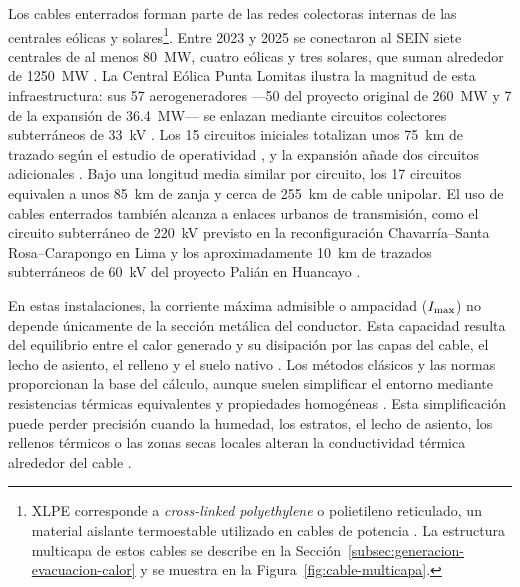 Los cables enterrados forman parte de las redes colectoras internas de las centrales eólicas y solares\footnote{XLPE corresponde a \textit{cross-linked polyethylene} o polietileno reticulado, un material aislante termoestable utilizado en cables de potencia \parencites[9--10]{thue1999electrical}{iec60502_2_2014}. La estructura multicapa de estos cables se describe en la Sección~\ref{subsec:generacion-evacuacion-calor} y se muestra en la Figura~\ref{fig:cable-multicapa}.}. Entre 2023 y 2025 se conectaron al SEIN siete centrales de al menos \SI{80}{\mega\watt}, cuatro eólicas y tres solares, que suman alrededor de \SI{1250}{\mega\watt} \parencites{osinergmin2024puntaLomitas}{minem2024nuevasRER}{minem2025nuevasCentrales}. La Central Eólica Punta Lomitas ilustra la magnitud de esta infraestructura: sus 57 aerogeneradores ---50 del proyecto original de \SI{260}{\mega\watt} y 7 de la expansión de \SI{36,4}{\mega\watt}--- se enlazan mediante circuitos colectores subterráneos de \SI{33}{\kilo\volt} \parencites{coes2021puntaLomitasEO}{engie2023puntaLomitas}. Los 15 circuitos iniciales totalizan unos \SI{75}{\kilo\metre} de trazado según el estudio de operatividad \parencite{coes2021puntaLomitasEO}, y la expansión añade dos circuitos adicionales \parencite{coes2022puntaLomitasExpansion}. Bajo una longitud media similar por circuito, los 17 circuitos equivalen a unos \SI{85}{\kilo\metre} de zanja y cerca de \SI{255}{\kilo\metre} de cable unipolar. El uso de cables enterrados también alcanza a enlaces urbanos de transmisión, como el circuito subterráneo de \SI{220}{\kilo\volt} previsto en la reconfiguración Chavarría--Santa Rosa--Carapongo en Lima \parencite[13]{coes2022planTransmision2023_2032} y los aproximadamente \SI{10}{\kilo\metre} de trazados subterráneos de \SI{60}{\kilo\volt} del proyecto Palián en Huancayo \parencites[168]{coes2022planTransmision2023_2032}[3,55--56]{proinversion2026palian}.

En estas instalaciones, la corriente máxima admisible o ampacidad ($I_{\max}$) no depende únicamente de la sección metálica del conductor. Esta capacidad resulta del equilibrio entre el calor generado y su disipación por las capas del cable, el lecho de asiento, el relleno y el suelo nativo \parencites{iec60287}{fariz2026}{mobius2025}. Los métodos clásicos y las normas proporcionan la base del cálculo, aunque suelen simplificar el entorno mediante resistencias térmicas equivalentes y propiedades homogéneas \parencites[752--760]{neher1957}{iec60287}{iec60853}. Esta simplificación puede perder precisión cuando la humedad, los estratos, el lecho de asiento, los rellenos térmicos o las zonas secas locales alteran la conductividad térmica alrededor del cable \parencites[4--6]{enescu2021}[1--3]{aldulaimi2024}.

